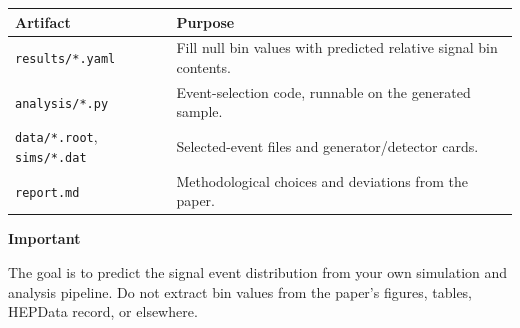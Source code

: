 \documentclass{article}
\begin{document}
\begin{agentcard}
\begin{center}
\begin{tabular}{ll}
\toprule
Artifact & Purpose \\
\midrule
\texttt{results/*.yaml} & Fill null bin values with predicted relative signal bin contents. \\
\texttt{analysis/*.py} & Event-selection code, runnable on the generated sample. \\
\texttt{data/*.root}, \texttt{sims/*.dat} & Selected-event files and generator/detector cards. \\
\texttt{report.md} & Methodological choices and deviations from the paper. \\
\bottomrule
\end{tabular}
\end{center}

\textbf{Important}

The goal is to predict the signal event distribution from your own simulation and analysis pipeline. Do not extract bin values from the paper's figures, tables, HEPData record, or elsewhere.

\end{agentcard}

\vspace{10pt}
\end{document}
